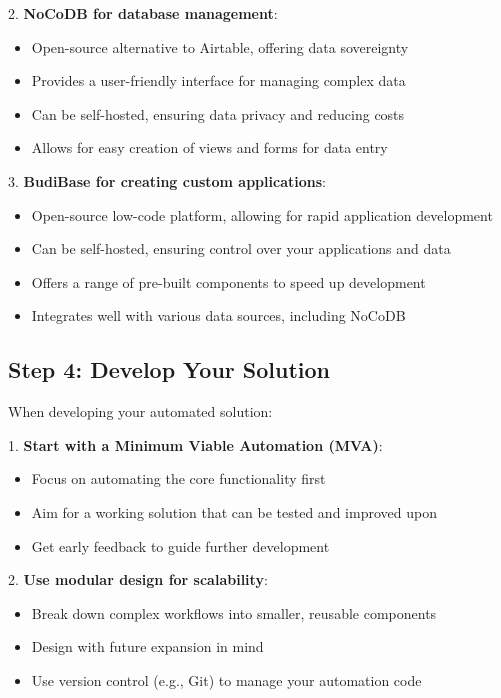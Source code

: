 2. \textbf{NoCoDB for database management}:
\begin{itemize}
    \item Open-source alternative to Airtable, offering data sovereignty
    \item Provides a user-friendly interface for managing complex data
    \item Can be self-hosted, ensuring data privacy and reducing costs
    \item Allows for easy creation of views and forms for data entry
\end{itemize}

3. \textbf{BudiBase for creating custom applications}:
\begin{itemize}
    \item Open-source low-code platform, allowing for rapid application development
    \item Can be self-hosted, ensuring control over your applications and data
    \item Offers a range of pre-built components to speed up development
    \item Integrates well with various data sources, including NoCoDB
\end{itemize}


\subsection{Step 4: Develop Your Solution}

When developing your automated solution:

1. \textbf{Start with a Minimum Viable Automation (MVA)}:
\begin{itemize}
    \item Focus on automating the core functionality first
    \item Aim for a working solution that can be tested and improved upon
    \item Get early feedback to guide further development
\end{itemize}

2. \textbf{Use modular design for scalability}:
\begin{itemize}
    \item Break down complex workflows into smaller, reusable components
    \item Design with future expansion in mind
    \item Use version control (e.g., Git) to manage your automation code
\end{itemize}


